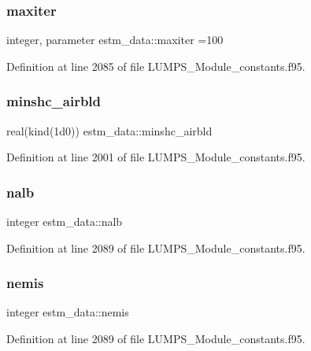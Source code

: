 \subsubsection{\texorpdfstring{maxiter}{maxiter}}
{\footnotesize\ttfamily integer, parameter estm\+\_\+data\+::maxiter =100}



Definition at line 2085 of file L\+U\+M\+P\+S\+\_\+\+Module\+\_\+constants.\+f95.

\mbox{\label{namespaceestm__data_a4376f642f063a592c13354381436ceaa}} 
\subsubsection{\texorpdfstring{minshc\+\_\+airbld}{minshc\_airbld}}
{\footnotesize\ttfamily real(kind(1d0)) estm\+\_\+data\+::minshc\+\_\+airbld}



Definition at line 2001 of file L\+U\+M\+P\+S\+\_\+\+Module\+\_\+constants.\+f95.

\mbox{\label{namespaceestm__data_af0ef7f03ce2a913a43a1b3dcccc478f9}} 
\subsubsection{\texorpdfstring{nalb}{nalb}}
{\footnotesize\ttfamily integer estm\+\_\+data\+::nalb}



Definition at line 2089 of file L\+U\+M\+P\+S\+\_\+\+Module\+\_\+constants.\+f95.

\mbox{\label{namespaceestm__data_a781ad000e3af86859a4cba9329017189}} 
\subsubsection{\texorpdfstring{nemis}{nemis}}
{\footnotesize\ttfamily integer estm\+\_\+data\+::nemis}



Definition at line 2089 of file L\+U\+M\+P\+S\+\_\+\+Module\+\_\+constants.\+f95.

